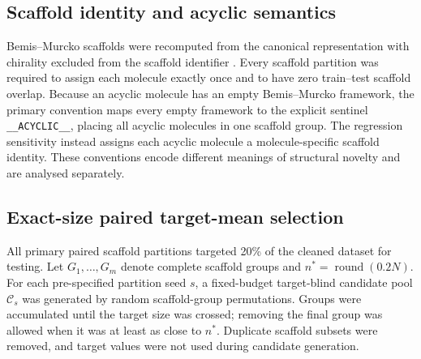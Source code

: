 \subsection{Scaffold identity and acyclic semantics}

Bemis--Murcko scaffolds were recomputed from the canonical representation with chirality excluded from the scaffold identifier \citep{bemis1996properties}. Every scaffold partition was required to assign each molecule exactly once and to have zero train--test scaffold overlap. Because an acyclic molecule has an empty Bemis--Murcko framework, the primary convention maps every empty framework to the explicit sentinel \texttt{\_\_ACYCLIC\_\_}, placing all acyclic molecules in one scaffold group. The regression sensitivity instead assigns each acyclic molecule a molecule-specific scaffold identity. These conventions encode different meanings of structural novelty and are analysed separately.

\subsection{Exact-size paired target-mean selection}

All primary paired scaffold partitions targeted 20\% of the cleaned dataset for testing. Let $G_1,\ldots,G_m$ denote complete scaffold groups and $n^*=\operatorname{round}(0.2N)$. For each pre-specified partition seed $s$, a fixed-budget target-blind candidate pool $\mathcal{C}_s$ was generated by random scaffold-group permutations. Groups were accumulated until the target size was crossed; removing the final group was allowed when it was at least as close to $n^*$. Duplicate scaffold subsets were removed, and target values were not used during candidate generation.

